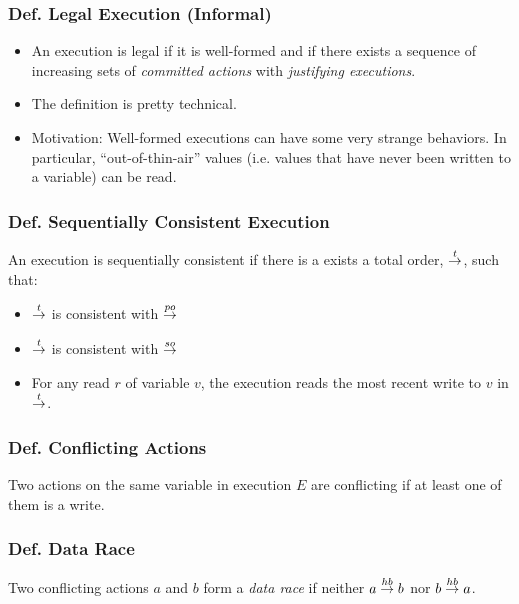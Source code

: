 \begin{frame}
    \frametitle{\textbf{Def.} Legal Execution (Informal)}

    \begin{itemize}
        \item An execution is legal if it is well-formed and if there exists a
              sequence of increasing sets of \textit{committed actions} with
              \textit{justifying executions}.

        \item The definition is pretty technical.

        \item Motivation: Well-formed executions can have some very strange
              behaviors. In particular, ``out-of-thin-air'' values (i.e. values
              that have never been written to a variable) can be read.
    \end{itemize}
\end{frame}

\begin{frame}
    \frametitle{\textbf{Def.} Sequentially Consistent Execution}

    An execution is sequentially consistent if there is a exists a total order,
    $\overset{t}{\rightarrow}$, such that:

    \begin{itemize}[itemsep=0.3em]
        \item $\overset{t}{\rightarrow}$ is consistent with $\overset{po}{\rightarrow}$
        \item $\overset{t}{\rightarrow}$ is consistent with $\overset{so}{\rightarrow}$
        \item For any read $r$ of variable $v$, the execution reads the most
              recent write to $v$ in $\overset{t}{\rightarrow}$.
    \end{itemize}
\end{frame}

\begin{frame}
    \frametitle{\textbf{Def.} Conflicting Actions}

    Two actions on the same variable in execution $E$ are conflicting if
    at least one of them is a write.
\end{frame}

\begin{frame}
    \frametitle{\textbf{Def.} Data Race}

    Two conflicting actions $a$ and $b$ form a \textit{data race} if neither
    $a \overset{hb}{\rightarrow} b$ nor $b \overset{hb}{\rightarrow} a$.
\end{frame}

